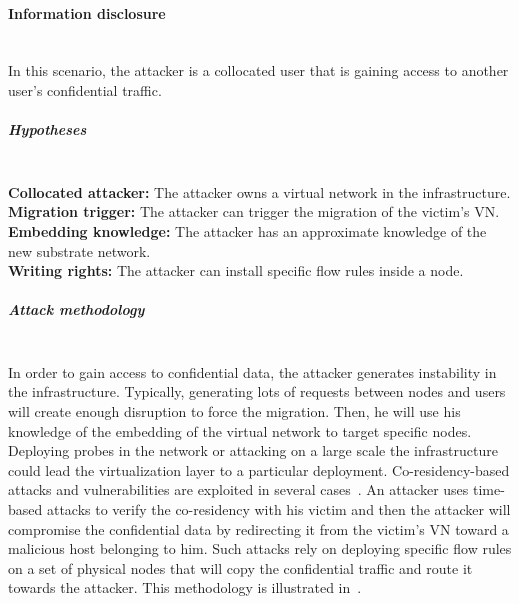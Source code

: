 \paragraph{Information disclosure}\textbf{\\}
In this scenario, the attacker is a collocated user that is gaining access to another user's confidential traffic. 
\subparagraph{Hypotheses}\textbf{\\}
\textbf{Collocated attacker:} The attacker owns a virtual network in the infrastructure.\\
\textbf{Migration trigger:} The attacker can trigger the migration of the victim's VN.\\
\textbf{Embedding knowledge:} The attacker has an approximate knowledge of the new substrate network.\\
\textbf{Writing rights:} The attacker can install specific flow rules inside a node.

\subparagraph{Attack methodology}\textbf{\\}
In order to gain access to confidential data, the attacker generates instability in the infrastructure. Typically, generating lots of requests between nodes and users will create enough disruption to force the migration.
Then, he will use his knowledge of the embedding of the virtual network to target specific nodes.
Deploying probes in the network or attacking on a large scale the infrastructure could lead the virtualization layer to a particular deployment. Co-residency-based attacks and vulnerabilities are exploited in several cases~\cite{malicious-atya2017,nomad-Moon2015b,getoffmucloud-Ristenpart2009,stalling-atya2017}.
An attacker uses time-based attacks to verify the co-residency with his victim and then the attacker will compromise the confidential data by redirecting it from the victim's VN toward a malicious host belonging to him.
Such attacks rely on deploying specific flow rules on a set of physical nodes that will copy the confidential traffic and route it towards the attacker.
This methodology is illustrated in~\cite{Costa2015,Sphinx-Dhawan2015}.


